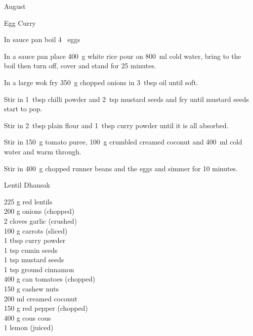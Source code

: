\begin{menu}{August}
\begin{recipe}{2}{Egg Curry}
    \begin{instructions}
    \item 
        In sauce pan boil
        4~  eggs\item 
    In a
    sauce pan
    place
    400~g  white rice
    pour on
    800~ml  cold water,
    bring to the boil then turn off, cover and stand for 25 minutes.
  \item 
        In a large wok fry
        350~g chopped onions
        in
        3~tbsp  oil
        until soft.
      \item 
        Stir in 1~tbsp  chilli powder
        and
        2~tsp  mustard seeds
        and fry until mustard seeds start to pop.
      \item 
        Stir in
        2~tbsp  plain flour
        and
        1~tbsp  curry powder
        until it is all absorbed.
      \item 
        Stir in
        150~g  tomato puree,
        100~g crumbled creamed coconut
        and
        400~ml  cold water
        and warm through.
      \item 
        Stir in
        400~g chopped runner beans
        and the eggs
        and simmer for 10 minutes.
      
    \end{instructions}
    \end{recipe}%
  
    \begin{recipe}{2}{Lentil Dhansak}%
		\begin{ingredients}
		225 g red lentils  \\
	200 g onions (chopped) \\
	2 cloves garlic (crushed) \\
	100 g carrots (sliced) \\
	1 tbsp curry powder  \\
	1 tsp cumin seeds  \\
	1 tsp mustard seeds  \\
	1 tsp ground cinnamon  \\
	400 g can tomatoes (chopped) \\
	150 g cashew nuts  \\
	200 ml creamed coconut  \\
	150 g red pepper (chopped) \\
	400 g cous cous  \\
	1  lemon (juiced) \\
	
		\end{ingredients}
	

\end{recipe}
\end{menu}

